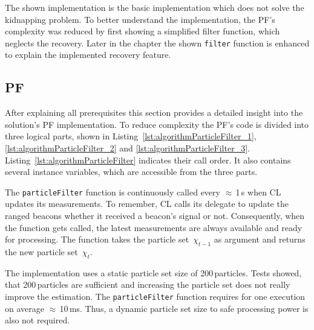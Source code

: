 The shown implementation is the basic implementation which does not solve the kidnapping problem. To better understand the implementation, the \acs{PF}'s complexity was reduced by first showing a simplified filter function, which neglects the recovery. Later in the chapter the shown \texttt{filter} function is enhanced to explain the implemented recovery feature.




\subsection{\acl{PF}}



After explaining all prerequisites this section provides a detailed insight into the solution's \acl{PF} implementation. To reduce complexity the \acs{PF}'s code is divided into three logical parts, shown in Listing~\ref{lst:algorithmParticleFilter_1}, \ref{lst:algorithmParticleFilter_2} and \ref{lst:algorithmParticleFilter_3}. Listing~\ref{lst:algorithmParticleFilter} indicates their call order. It also contains several instance variables, which are accessible from the three parts.

The \texttt{particleFilter} function is continuously called every $\approx$\,1\,s when \ac{CL} updates its measurements. To remember, \ac{CL} calls its delegate to update the ranged beacons whether it received a beacon's signal or not. Consequently, when the function gets called, the latest measurements are always available and ready for processing. The function takes the particle set~$\chi_{t-1}$ as argument and returns the new particle set~$\chi_t$.

The implementation uses a static particle set size of 200\,particles. Tests showed, that 200\,particles are sufficient and increasing the particle set does not really improve the estimation. The \texttt{particleFilter} function requires for one execution on average $\approx$\,10\,ms. Thus, a dynamic particle set size to safe processing power is also not required.


